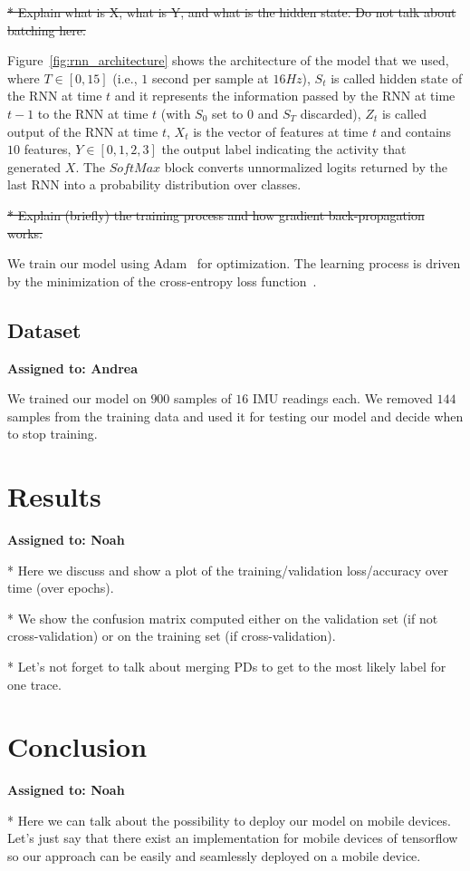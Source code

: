 \documentclass{article}
\begin{document}
\st{* Explain what is X, what is Y, and what is the hidden state. Do not talk about batching here.}

Figure~\ref{fig:rnn_architecture} shows the architecture of the model that we used, where
$T \in [0,15]$ (i.e., $1$ second per sample at $16Hz$), $S_t$ is called hidden state of the
RNN at time $t$ and it represents the information passed by the RNN at time $t-1$ to the RNN
at time $t$ (with $S_0$ set to $0$ and $S_T$ discarded), $Z_t$ is called output of the RNN
at time $t$, $X_t$ is the vector of features at time $t$ and contains $10$ features, 
$Y \in [0,1,2,3]$ the output label indicating the activity that generated $X$. 
The $SoftMax$ block converts 
unnormalized logits returned by the last RNN into a probability distribution over classes.


\st{* Explain (briefly) the training process and how gradient back-propagation works.}

We train our model using Adam~\cite{kingma2014adam} for
optimization. The learning process is driven by the minimization of the cross-entropy loss
function~\cite{rubinstein1999cross}.

\subsection{Dataset}
\vspace{-.3cm} 
\textbf{Assigned to: Andrea}


We trained our model on $900$ samples of $16$ IMU readings each. We removed $144$ samples
from the training data and used it for testing our model and decide when to stop training.


\section{Results}
\vspace{-.3cm}
\textbf{Assigned to: Noah}

* Here we discuss and show a plot of the training/validation loss/accuracy over time (over epochs).

* We show the confusion matrix computed either on the validation set (if not cross-validation) or
on the training set (if cross-validation).

* Let's not forget to talk about merging PDs to get to the most likely label for one trace.


\section{Conclusion}
\vspace{-.3cm}
\textbf{Assigned to: Noah}

* Here we can talk about the possibility to deploy our model on mobile devices. Let's just say that 
there exist an implementation for mobile devices of tensorflow so our approach can be easily and 
seamlessly deployed on a mobile device.
\end{document}
